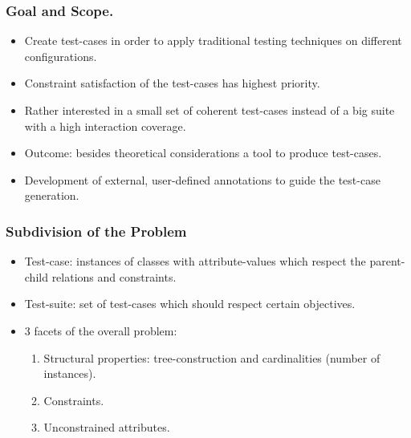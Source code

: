 \documentclass[swedish]{beamer}
\begin{document}
 \begin{frame}
  \frametitle{Goal and Scope.}
  \begin{itemize}
   \item Create test-cases in order to apply traditional testing techniques on different configurations.
   
   \item Constraint satisfaction of the test-cases has highest priority.
   
   \item Rather interested in a small set of coherent test-cases instead of a big suite with a high interaction coverage.
   
   \item Outcome: besides theoretical considerations a tool to produce test-cases.
   
   \item Development of external, user-defined annotations to guide the test-case generation.
  \end{itemize}
 \end{frame}
 
 \begin{frame}
  \frametitle{Subdivision of the Problem}
  \begin{itemize}
   \item Test-case: instances of classes with attribute-values which respect the parent-child relations and constraints.
   \item Test-suite: set of test-cases which should respect certain objectives.
   \item 3 facets of the overall problem:
    \begin{enumerate}
     \item Structural properties: tree-construction and cardinalities (number of instances). 
     \item Constraints.
     \item Unconstrained attributes.
    \end{enumerate}
  \end{itemize}
 \end{frame}
 
\end{document}
